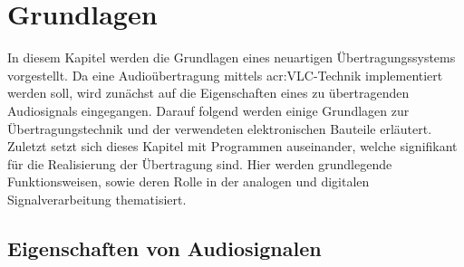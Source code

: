 \chapter{Grundlagen}
\label{chap:fundamentals_related-work}
In diesem Kapitel werden die Grundlagen eines neuartigen Übertragungssystems vorgestellt. Da eine Audioübertragung mittels \gls{acr:VLC}-Technik implementiert werden soll, wird zunächst auf die Eigenschaften eines zu übertragenden Audiosignals eingegangen. Darauf folgend werden einige Grundlagen zur Übertragungstechnik und der verwendeten elektronischen Bauteile erläutert. Zuletzt setzt sich dieses Kapitel mit Programmen auseinander, welche signifikant für die Realisierung der Übertragung sind. Hier werden grundlegende Funktionsweisen, sowie deren Rolle in der analogen und digitalen Signalverarbeitung thematisiert. 

\section{Eigenschaften von Audiosignalen}
\label{subsec:audio}


